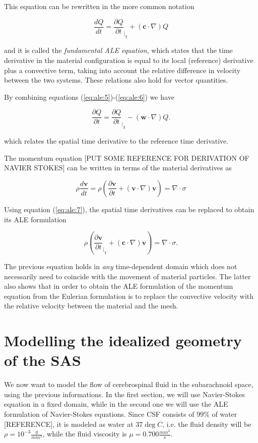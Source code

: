 \documentclass[a4paper,11pt,openright,twoside]{book}
\begin{document}
This equation can be rewritten in the more common notation

\begin{equation}
\label{eq:ale:5}
\frac{d Q}{d t} = \frac{\partial Q}{\partial t}_{|_\chi} + (\mathbf{c} \cdot \nabla) Q
\end{equation}

and it is called the \emph{fundamental ALE equation}, which states that the time derivative in the material configuration is equal to its local (reference) derivative plus a convective term, taking into account the relative difference in velocity between the two systems. These relations also hold for vector quantities.

By combining equations (\ref{eq:ale:5})-(\ref{eq:ale:6}) we have

\begin{equation}
\label{eq:ale:7}
\frac{\partial Q}{\partial t} = \frac{\partial Q}{\partial t}_{|_\chi} - (\mathbf{w} \cdot \nabla) Q.
\end{equation}

which relates the spatial time derivative to the reference time derivative.

The momentum equation [PUT SOME REFERENCE FOR DERIVATION OF NAVIER STOKES] can be written in terms of the material derivatives as

\begin{equation}
\rho \frac{d \mathbf{v}}{d t} = \rho (\frac{\partial \mathbf{v}}{\partial t} + (\mathbf{v} \cdot \nabla)\mathbf{v}) = \nabla \cdot \sigma
\end{equation}

Using equation (\ref{eq:ale:7}), the spatial time derivatives can be replaced to obtain its ALE formulation

\begin{equation}
\rho (\frac{\partial \mathbf{v}}{\partial t}_{|_\chi} + (\mathbf{c} \cdot \nabla)\mathbf{v}) = \nabla \cdot \sigma. 
\end{equation}

The previous equation holds in \emph{any} time-dependent domain which does not necessarily need to coincide with the movement of material particles. The latter also shows that in order to obtain the ALE formulation of the momentum equation from the Eulerian formulation is to replace the convective velocity with the relative velocity between the material and the mesh.


\section{Modelling the idealized geometry of the SAS}
We now want to model the flow of cerebrospinal fluid in the subarachnoid space, using the previous informations. In the first section, we will use Navier-Stokes equation in a fixed domain, while in the second one we will use the ALE formulation of Navier-Stokes equations. Since CSF consists of $99 \% $ of water [REFERENCE], it is modeled as water at $37 \deg C$, i.e. the fluid density will be $\rho = 10^{-3} \frac{g}{mm^3}$, while the fluid viscosity is $\mu = 0.700 \frac{mm^2}{s}$. 
\end{document}
